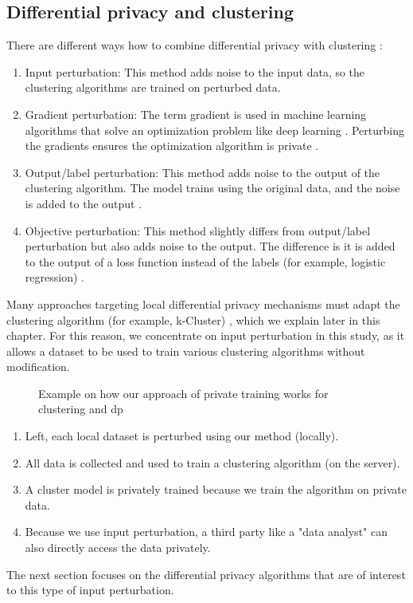 \subsection{Differential privacy and clustering} \label{theory:literature-review:dp-clustering}
There are different ways how to combine differential privacy with clustering \citep{baraheem_survey_2022}:
\begin{enumerate}
  \item Input perturbation: This method adds noise to the input data, so the clustering algorithms are trained on perturbed data.
  \item Gradient perturbation: The term gradient is used in machine learning algorithms that solve an optimization problem like deep learning \citep{hassan_differential_2019}.
        Perturbing the gradients ensures the optimization algorithm is private \citep{ji_differential_2014}.
  \item Output/label perturbation: This method adds noise to the output of the clustering algorithm.
        The model trains using the original data, and the noise is added to the output \citep{ji_differential_2014}.
  \item Objective perturbation: This method slightly differs from output/label perturbation but also adds noise to the output.
        The difference is it is added to the output of a loss function instead of the labels (for example, logistic regression) \citep{baraheem_survey_2022}.
\end{enumerate}
Many approaches targeting local differential privacy mechanisms must adapt the clustering algorithm (for example, k-Cluster) \citep{sun_distributed_2019}, which we explain later in this chapter.
For this reason, we concentrate on input perturbation in this study, as it allows a dataset to be used to train various clustering algorithms without modification.
\begin{figure}[H]
  
  \caption{Example on how our approach of private training works for clustering and \gls{dp}}
  \label{fig:overview-clustering-and-dp}
\end{figure}
\begin{enumerate}
  \item Left, each local dataset is perturbed using our method (locally).
  \item All data is collected and used to train a clustering algorithm (on the server).
  \item A cluster model is privately trained because we train the algorithm on private data.
  \item Because we use input perturbation, a third party like a "data analyst" can also directly access the data privately.
\end{enumerate}
The next section focuses on the differential privacy algorithms that are of interest to this type of input perturbation.

